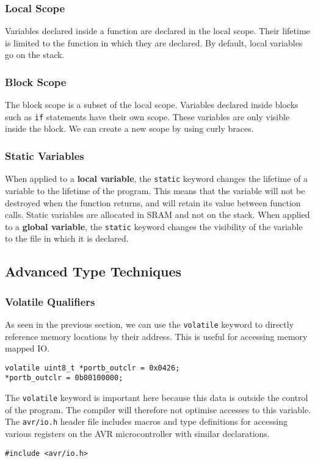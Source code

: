 \documentclass{article}
\begin{document}
\subsubsection{Local Scope}
Variables declared inside a function are declared in the local scope.
Their lifetime is limited to the function in which they are declared.
By default, local variables go on the stack.
\subsubsection{Block Scope}
The block scope is a subset of the local scope. Variables declared
inside blocks such as \texttt{if} statements have their own
scope. These variables are only visible inside the block. We can create
a new scope by using curly braces.
\subsubsection{Static Variables}
When applied to a \textbf{local variable}, the \texttt{static}
keyword changes the lifetime of a variable to the lifetime of the
program. This means that the variable will not be destroyed when the
function returns, and will retain its value between function calls.
Static variables are allocated in SRAM and not on the stack. When
applied to a \textbf{global variable}, the \texttt{static}
keyword changes the visibility of the variable to the file in which it
is declared.
\subsection{Advanced Type Techniques}
\subsubsection{Volatile Qualifiers}
As seen in the previous section, we can use the
\texttt{volatile} keyword to directly reference memory locations
by their address. This is useful for accessing memory mapped IO\@.
\begin{verbatim}
volatile uint8_t *portb_outclr = 0x0426;
*portb_outclr = 0b00100000;
\end{verbatim}
The \texttt{volatile} keyword is important here because this
data is outside the control of the program. The compiler will therefore
not optimise accesses to this variable. The \texttt{avr/io.h}
header file includes macros and type definitions for accessing various
registers on the AVR microcontroller with similar declarations.
\begin{verbatim}
#include <avr/io.h>
\end{verbatim}
\end{document}
